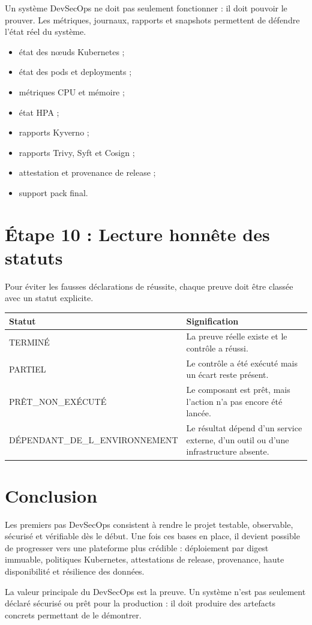 \documentclass[12pt,a4paper]{article}
\begin{document}
Un système DevSecOps ne doit pas seulement fonctionner : il doit pouvoir le
prouver. Les métriques, journaux, rapports et snapshots permettent de défendre
l'état réel du système.

\begin{itemize}[leftmargin=*]
  \item état des nœuds Kubernetes ;
  \item état des pods et deployments ;
  \item métriques CPU et mémoire ;
  \item état HPA ;
  \item rapports Kyverno ;
  \item rapports Trivy, Syft et Cosign ;
  \item attestation et provenance de release ;
  \item support pack final.
\end{itemize}

\section{Étape 10 : Lecture honnête des statuts}

Pour éviter les fausses déclarations de réussite, chaque preuve doit être
classée avec un statut explicite.

\begin{longtable}{|p{4cm}|p{9cm}|}
\hline
\textbf{Statut} & \textbf{Signification} \\
\hline
TERMINÉ & La preuve réelle existe et le contrôle a réussi. \\
\hline
PARTIEL & Le contrôle a été exécuté mais un écart reste présent. \\
\hline
PRÊT\_NON\_EXÉCUTÉ & Le composant est prêt, mais l'action n'a pas encore été
lancée. \\
\hline
DÉPENDANT\_DE\_L\_ENVIRONNEMENT & Le résultat dépend d'un service externe, d'un
outil ou d'une infrastructure absente. \\
\hline
\end{longtable}

\section{Conclusion}

Les premiers pas DevSecOps consistent à rendre le projet testable, observable,
sécurisé et vérifiable dès le début. Une fois ces bases en place, il devient
possible de progresser vers une plateforme plus crédible : déploiement par
digest immuable, politiques Kubernetes, attestations de release, provenance,
haute disponibilité et résilience des données.

La valeur principale du DevSecOps est la preuve. Un système n'est pas seulement
déclaré sécurisé ou prêt pour la production : il doit produire des artefacts
concrets permettant de le démontrer.
\end{document}
